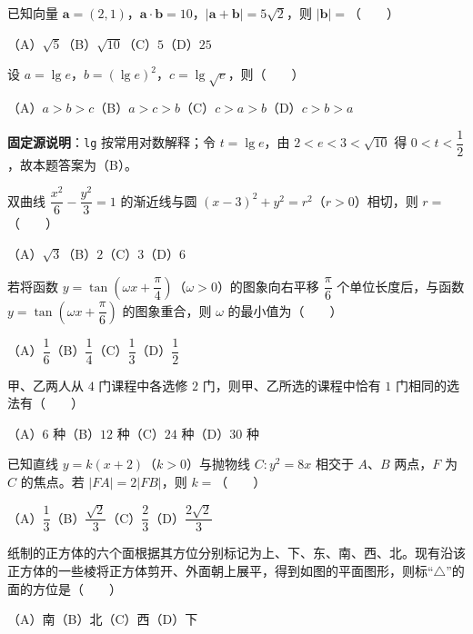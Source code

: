 \begin{question}
已知向量 $\boldsymbol a=(2,1)$，$\boldsymbol a\cdot\boldsymbol b=10$，$|\boldsymbol a+\boldsymbol b|=5\sqrt2$，则 $|\boldsymbol b|=$\mbox{（　　）}

（A）$\sqrt5$\quad（B）$\sqrt{10}$\quad（C）$5$\quad（D）$25$

\end{question}
\begin{question}
设 $a=\lg e$，$b=(\lg e)^2$，$c=\lg\sqrt e$，则\mbox{（　　）}

（A）$a>b>c$\quad（B）$a>c>b$\quad（C）$c>a>b$\quad（D）$c>b>a$

\begin{gktip}
\textbf{固定源说明}：\texttt{lg} 按常用对数解释；令 $t=\lg e$，由 $2<e<3<\sqrt{10}$ 得 $0<t<\dfrac12$，故本题答案为（B）。
\end{gktip}

\end{question}
\begin{question}
双曲线 $\dfrac{x^2}{6}-\dfrac{y^2}{3}=1$ 的渐近线与圆 $(x-3)^2+y^2=r^2$（$r>0$）相切，则 $r=$\mbox{（　　）}

（A）$\sqrt3$\quad（B）$2$\quad（C）$3$\quad（D）$6$

\end{question}
\begin{question}
若将函数 $y=\tan\left(\omega x+\dfrac\pi4\right)$（$\omega>0$）的图象向右平移 $\dfrac\pi6$ 个单位长度后，与函数 $y=\tan\left(\omega x+\dfrac\pi6\right)$ 的图象重合，则 $\omega$ 的最小值为\mbox{（　　）}

（A）$\dfrac16$\quad（B）$\dfrac14$\quad（C）$\dfrac13$\quad（D）$\dfrac12$

\end{question}
\begin{question}
甲、乙两人从 $4$ 门课程中各选修 $2$ 门，则甲、乙所选的课程中恰有 $1$ 门相同的选法有\mbox{（　　）}

（A）$6$ 种\quad（B）$12$ 种\quad（C）$24$ 种\quad（D）$30$ 种

\end{question}
\begin{question}
已知直线 $y=k(x+2)$（$k>0$）与抛物线 $C:y^2=8x$ 相交于 $A\text{、}B$ 两点，$F$ 为 $C$ 的焦点。若 $|FA|=2|FB|$，则 $k=$\mbox{（　　）}

（A）$\dfrac13$\quad（B）$\dfrac{\sqrt2}{3}$\quad（C）$\dfrac23$\quad（D）$\dfrac{2\sqrt2}{3}$

\Needspace{0.4\textheight}
\end{question}
\begin{question}
纸制的正方体的六个面根据其方位分别标记为上、下、东、南、西、北。现有沿该正方体的一些棱将正方体剪开、外面朝上展平，得到如图的平面图形，则标“$\triangle$”的面的方位是\mbox{（　　）}
\nopagebreak[4]
\begin{center}\end{center}
\nopagebreak[4]
（A）南\quad（B）北\quad（C）西\quad（D）下

\end{question}

